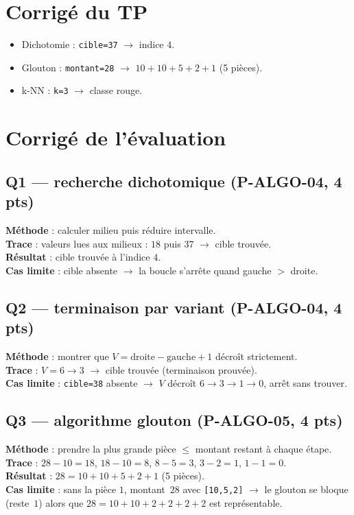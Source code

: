 \documentclass[a4paper,11pt]{article}
\begin{document}
\section*{Corrigé du TP}
\begin{itemize}[nosep]
  \item Dichotomie : \texttt{cible=37} $\rightarrow$ indice $4$.
  \item Glouton : \texttt{montant=28} $\rightarrow$ $10+10+5+2+1$ (5 pièces).
  \item k-NN : \texttt{k=3} $\rightarrow$ classe rouge.
\end{itemize}

\section*{Corrigé de l'évaluation}

\subsection*{Q1 — recherche dichotomique (P-ALGO-04, 4 pts)}
\textbf{Méthode} : calculer milieu puis réduire intervalle.\\
\textbf{Trace} : valeurs lues aux milieux : $18$ puis $37$ $\rightarrow$ cible trouvée.\\
\textbf{Résultat} : cible trouvée à l'indice $4$.\\
\textbf{Cas limite} : cible absente $\rightarrow$ la boucle s'arrête quand gauche $>$ droite.

\subsection*{Q2 — terminaison par variant (P-ALGO-04, 4 pts)}
\textbf{Méthode} : montrer que $V = \text{droite} - \text{gauche} + 1$ décroît strictement.\\
\textbf{Trace} : $V = 6 \rightarrow 3$ $\rightarrow$ cible trouvée (terminaison prouvée).\\
\textbf{Cas limite} : \texttt{cible=38} absente $\rightarrow$ $V$ décroît $6 \rightarrow 3 \rightarrow 1 \rightarrow 0$, arrêt sans trouver.

\subsection*{Q3 — algorithme glouton (P-ALGO-05, 4 pts)}
\textbf{Méthode} : prendre la plus grande pièce $\leq$ montant restant à chaque étape.\\
\textbf{Trace} : $28 - 10 = 18$, $18 - 10 = 8$, $8 - 5 = 3$, $3 - 2 = 1$, $1 - 1 = 0$.\\
\textbf{Résultat} : $28 = 10 + 10 + 5 + 2 + 1$ (5 pièces).\\
\textbf{Cas limite} : sans la pièce $1$, montant~$28$ avec \texttt{[10,5,2]} $\rightarrow$ le glouton se bloque (reste~$1$) alors que $28 = 10{+}10{+}2{+}2{+}2{+}2$ est représentable.
\end{document}
